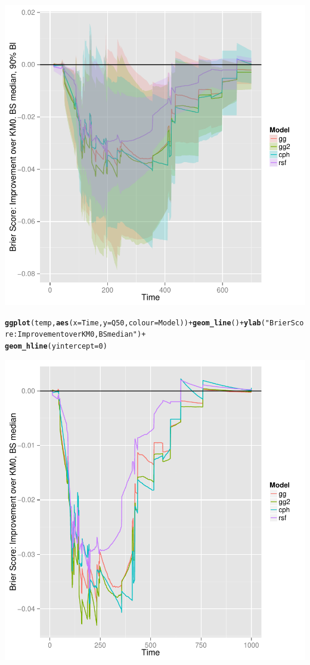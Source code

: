\documentclass{article}\usepackage[]{graphicx}\usepackage[]{color}
\makeatletter
\def\maxwidth{ %
  \ifdim\Gin@nat@width>\linewidth
    \linewidth
  \else
    \Gin@nat@width
  \fi
}
\newcommand{\hlnum}[1]{\textcolor[rgb]{0.686,0.059,0.569}{#1}}%
\newcommand{\hlstr}[1]{\textcolor[rgb]{0.192,0.494,0.8}{#1}}%
\newcommand{\hlopt}[1]{\textcolor[rgb]{0,0,0}{#1}}%
\newcommand{\hlstd}[1]{\textcolor[rgb]{0.345,0.345,0.345}{#1}}%
\newcommand{\hlkwc}[1]{\textcolor[rgb]{0.333,0.667,0.333}{#1}}%
\newcommand{\hlkwd}[1]{\textcolor[rgb]{0.737,0.353,0.396}{\textbf{#1}}}%
\newenvironment{kframe}{%
 \def\at@end@of@kframe{}%
 \ifinner\ifhmode%
  \def\at@end@of@kframe{\end{minipage}}%
  \begin{minipage}{\columnwidth}%
 \fi\fi%
 \def\FrameCommand##1{\hskip\@totalleftmargin \hskip-\fboxsep
 \colorbox{shadecolor}{##1}\hskip-\fboxsep
     \hskip-\linewidth \hskip-\@totalleftmargin \hskip\columnwidth}%
 \MakeFramed {\advance\hsize-\width
   \@totalleftmargin\z@ \linewidth\hsize
   \@setminipage}}%
 {\par\unskip\endMakeFramed%
 \at@end@of@kframe}
\newenvironment{knitrout}{}{} %
\makeatother
\begin{document}
\begin{knitrout}
{\centering \includegraphics[width=\maxwidth]{figure/model-selection-bs-paths-4} 

}


\begin{kframe}\begin{alltt}
\hlkwd{ggplot}\hlstd{(temp,} \hlkwd{aes}\hlstd{(}\hlkwc{x} \hlstd{= Time,} \hlkwc{y} \hlstd{= Q50,} \hlkwc{colour} \hlstd{= Model))} \hlopt{+} \hlkwd{geom_line}\hlstd{()} \hlopt{+} \hlkwd{ylab}\hlstd{(}\hlstr{"Brier Score: Improvement over KM0, BS median"}\hlstd{)} \hlopt{+}
    \hlkwd{geom_hline}\hlstd{(}\hlkwc{yintercept} \hlstd{=} \hlnum{0}\hlstd{)}
\end{alltt}
\end{kframe}

{\centering \includegraphics[width=\maxwidth]{figure/model-selection-bs-paths-5} 

}
\end{knitrout}
\end{document}
